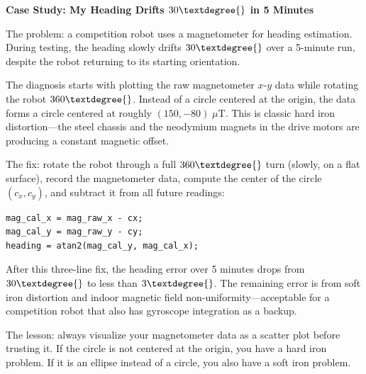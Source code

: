 
\vspace{0.5em}
\begin{mdframed}[linewidth=1pt, innertopmargin=10pt, innerbottommargin=10pt]
\textbf{Case Study: My Heading Drifts $30\textdegree{}$ in 5 Minutes}

\vspace{0.3em}
The problem: a competition robot uses a magnetometer for heading estimation. During testing, the heading slowly drifts $30\textdegree{}$ over a 5-minute run, despite the robot returning to its starting orientation.

The diagnosis starts with plotting the raw magnetometer $x$-$y$ data while rotating the robot $360\textdegree{}$. Instead of a circle centered at the origin, the data forms a circle centered at roughly $(150, -80)\;\mu\mathrm{T}$. This is classic hard iron distortion---the steel chassis and the neodymium magnets in the drive motors are producing a constant magnetic offset.

The fix: rotate the robot through a full $360\textdegree{}$ turn (slowly, on a flat surface), record the magnetometer data, compute the center of the circle $(c_x, c_y)$, and subtract it from all future readings:

\begin{verbatim}
mag_cal_x = mag_raw_x - cx;
mag_cal_y = mag_raw_y - cy;
heading = atan2(mag_cal_y, mag_cal_x);
\end{verbatim}

After this three-line fix, the heading error over 5 minutes drops from $30\textdegree{}$ to less than $3\textdegree{}$. The remaining error is from soft iron distortion and indoor magnetic field non-uniformity---acceptable for a competition robot that also has gyroscope integration as a backup.

The lesson: always visualize your magnetometer data as a scatter plot before trusting it. If the circle is not centered at the origin, you have a hard iron problem. If it is an ellipse instead of a circle, you also have a soft iron problem.
\end{mdframed}

